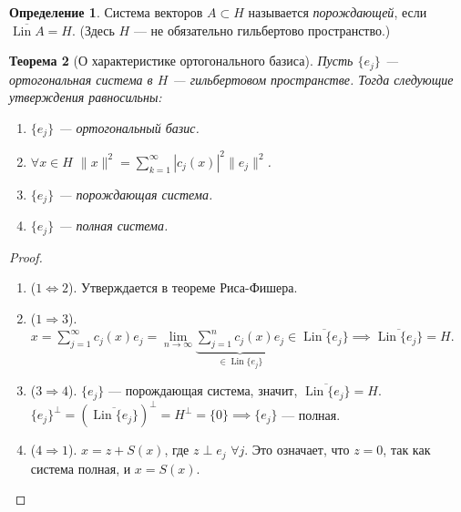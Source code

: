 \documentclass[11pt,openany,a4paper]{scrartcl}
\theoremstyle{plain}
\newtheorem{theorem}{Теорема}[subsection]
\theoremstyle{definition}
\newtheorem{definition}[theorem]{Определение}
\newcommand\ol{\overline}
\DeclareMathOperator{\Lin}{Lin}
\begin{document}
\begin{definition}
    Система векторов $A \subset H$ называется \emph{порождающей}, если
    $\ol{\Lin A} = H$. (Здесь $H$ — не обязательно гильбертово пространство.)
\end{definition}

\begin{theorem}[О характеристике ортогонального базиса]
    Пусть $\{e_j\}$ — ортогональная система в $H$ — гильбертовом пространстве.
    Тогда следующие утверждения 
    равносильны:
    \begin{enumerate}
        \item $\{e_j\}$ — ортогональный базис.
        \item $\forall x \in H$ $\|x\|^2 =
        \sum\limits_{k=1}^\infty |c_j(x)|^2\|e_j\|^2$.
        \item $\{e_j\}$ — порождающая система.
        \item $\{e_j\}$ — полная система.
    \end{enumerate}
\end{theorem}
\begin{proof}
\mbox{}
    \begin{enumerate}
        \item ($1 \Leftrightarrow 2$). Утверждается в теореме Риса-Фишера.
        \item ($1 \Rightarrow 3$). $x = \sum\limits_{j=1}^\infty c_j(x)e_j =
        \lim\limits_{n \to \infty}
        \underbrace{\sum\limits_{j=1}^n c_j(x) e_j}_{\in \Lin \{e_j\}} \in
        \ol{\Lin\{e_j\}} \implies \ol{\Lin \{e_j\}} = H$.
        \item ($3 \Rightarrow 4$). $\{e_j\}$ — порождающая система, значит,
        $\ol{\Lin\{e_j\}} = H$. $\{e_j\}^\perp = (\ol{\Lin\{e_j\}})^\perp =
        H^\perp = \{0\} \implies \{e_j\}$ — полная.
        \item ($4 \Rightarrow 1$). $x = z + S(x)$, где $z \perp e_j$ $\forall j$.
        Это означает, что $z = 0$, так как система полная, и $x = S(x)$.
    \end{enumerate}
\end{proof}
\end{document}
